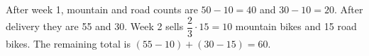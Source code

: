 After week 1, mountain and road counts are $50-10=40$ and $30-10=20$. After delivery they are 55 and 30. Week 2 sells $\dfrac{2}{3}\cdot 15=10$ mountain bikes and 15 road bikes. The remaining total is $(55-10)+(30-15)=\boxed{60}$.
